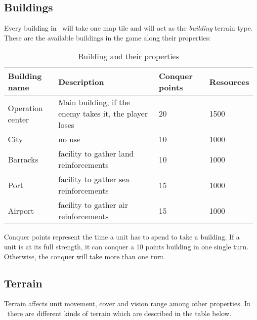 \subsection{Buildings}


Every building in \game\ will take one map tile and will act as the
\textit{building} terrain type. These are the available buildings in
the game along their properties:

\begin{table}[H]
    \label{tab:buildings}
    \begin{center}
    \begin{tabular}{| l | m{7cm}| m{3cm} | m{2.5cm} |}
        \hline
        \textbf{Building name} & \textbf{Description} & \textbf{Conquer points} & \textbf{Resources} \\
        \hline
        Operation center & Main building, if the enemy takes it, the player loses & 20 & 1500\\
        \hline
        City & no use & 10 & 1000 \\
        \hline
        Barracks & facility to gather land reinforcements & 10 & 1000 \\
        \hline
        Port & facility to gather sea reinforcements & 15 & 1000 \\
        \hline
        Airport & facility to gather air reinforcements & 15 & 1000 \\
        \hline
    \end{tabular}
    \end{center}
\caption{Building and their properties}
\end{table}

Conquer points represent the time a unit has to spend to take a building. If a
unit is at its full strength, it can conquer a 10 points building in one single
turn. Otherwise, the conquer will take more than one turn.\\

\subsection{Terrain}


Terrain affects unit movement, cover and vision range among other properties.
In \game\ there are different kinds of terrain which are described in the table
below.\\

